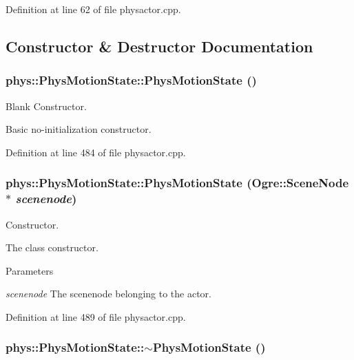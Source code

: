 Definition at line 62 of file physactor.cpp.



\subsection{Constructor \& Destructor Documentation}
\hypertarget{classphys_1_1PhysMotionState_ac685ae94d7ee7740aaee8c1a1132b27a}{
\subsubsection[{PhysMotionState}]{\setlength{\rightskip}{0pt plus 5cm}phys::PhysMotionState::PhysMotionState ()}}
\label{dc/d0d/classphys_1_1PhysMotionState_ac685ae94d7ee7740aaee8c1a1132b27a}


Blank Constructor. 

Basic no-\/initialization constructor. 

Definition at line 484 of file physactor.cpp.

\hypertarget{classphys_1_1PhysMotionState_a505aa5ea3bbaba4710924f030f4ed008}{
\subsubsection[{PhysMotionState}]{\setlength{\rightskip}{0pt plus 5cm}phys::PhysMotionState::PhysMotionState (Ogre::SceneNode $\ast$ {\em scenenode})}}
\label{dc/d0d/classphys_1_1PhysMotionState_a505aa5ea3bbaba4710924f030f4ed008}


Constructor. 

The class constructor. 
\begin{DoxyParams}{Parameters}
\item[{\em scenenode}]The scenenode belonging to the actor. \end{DoxyParams}


Definition at line 489 of file physactor.cpp.

\hypertarget{classphys_1_1PhysMotionState_a20798e3dce2d71a938c3607a8610eaac}{
\subsubsection[{$\sim$PhysMotionState}]{\setlength{\rightskip}{0pt plus 5cm}phys::PhysMotionState::$\sim$PhysMotionState ()}}
\label{dc/d0d/classphys_1_1PhysMotionState_a20798e3dce2d71a938c3607a8610eaac}


